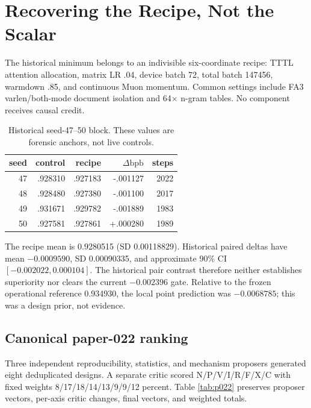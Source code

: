 \documentclass{article}
\newcommand{\bpb}{\mathrm{bpb}}
\begin{document}
\section{Recovering the Recipe, Not the Scalar}

The historical minimum belongs to an indivisible six-coordinate recipe:
TTTL attention allocation, matrix LR .04, device batch 72, total batch
147456, warmdown .85, and continuous Muon momentum.  Common settings include
FA3 varlen/both-mode document isolation and 64$\times$ n-gram tables.
No component receives causal credit.

\begin{table}[t]
\caption{Historical seed-47--50 block.  These values are forensic anchors,
not live controls.}
\label{tab:history}
\centering\small
\begin{tabular}{rrrrr}
\toprule
seed & control & recipe & $\Delta\bpb$ & steps\\
\midrule
47 & .928310 & .927183 & -.001127 & 2022\\
48 & .928480 & .927380 & -.001100 & 2017\\
49 & .931671 & .929782 & -.001889 & 1983\\
50 & .927581 & .927861 & +.000280 & 1989\\
\bottomrule
\end{tabular}
\end{table}

The recipe mean is 0.9280515 (SD 0.00118829).  Historical paired deltas have
mean $-0.0009590$, SD 0.00090335, and approximate 90\% CI
$[-0.002022,0.000104]$.  The historical pair contrast therefore neither
establishes superiority nor clears the current $-0.002396$ gate.  Relative to
the frozen operational reference 0.934930, the local point prediction was
$-0.0068785$; this was a design prior, not evidence.

\subsection{Canonical paper-022 ranking}

Three independent reproducibility, statistics, and mechanism proposers
generated eight deduplicated designs.  A separate critic scored
N/P/V/I/R/F/X/C with fixed weights
8/17/18/14/13/9/9/12 percent.  Table \ref{tab:p022} preserves proposer
vectors, per-axis critic changes, final vectors, and weighted totals.
\end{document}
